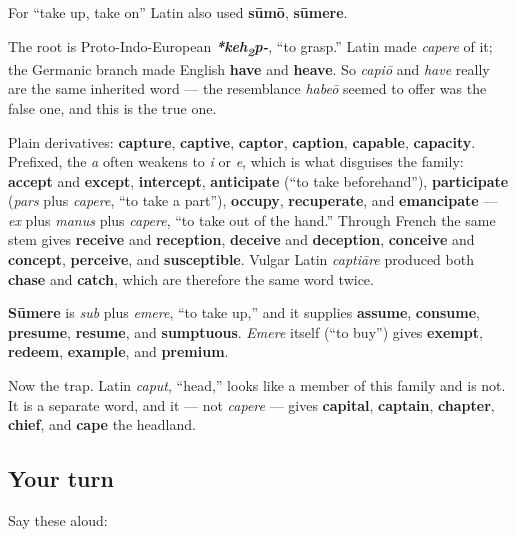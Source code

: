 For \textquotedblleft{}take up, take on\textquotedblright{} Latin also used \textbf{sūmō}, \textbf{sūmere}.

\begin{cousinweb}
The root is Proto-Indo-European \emph{\textbf{*keh\textsubscript{2}p-}}, \textquotedblleft{}to grasp.\textquotedblright{} Latin made \emph{capere} of it; the Germanic branch made English \textbf{have} and \textbf{heave}. So \emph{capiō} and \emph{have} really are the same inherited word — the resemblance \emph{habeō} seemed to offer was the false one, and this is the true one.

Plain derivatives: \textbf{capture}, \textbf{captive}, \textbf{captor}, \textbf{caption}, \textbf{capable}, \textbf{capacity}. Prefixed, the \emph{a} often weakens to \emph{i} or \emph{e}, which is what disguises the family: \textbf{accept} and \textbf{except}, \textbf{intercept}, \textbf{anticipate} (\textquotedblleft{}to take beforehand\textquotedblright{}), \textbf{participate} (\emph{pars} plus \emph{capere}, \textquotedblleft{}to take a part\textquotedblright{}), \textbf{occupy}, \textbf{recuperate}, and \textbf{emancipate} — \emph{ex} plus \emph{manus} plus \emph{capere}, \textquotedblleft{}to take out of the hand.\textquotedblright{} Through French the same stem gives \textbf{receive} and \textbf{reception}, \textbf{deceive} and \textbf{deception}, \textbf{conceive} and \textbf{concept}, \textbf{perceive}, and \textbf{susceptible}. Vulgar Latin \emph{captiāre} produced both \textbf{chase} and \textbf{catch}, which are therefore the same word twice.

\textbf{Sūmere} is \emph{sub} plus \emph{emere}, \textquotedblleft{}to take up,\textquotedblright{} and it supplies \textbf{assume}, \textbf{consume}, \textbf{presume}, \textbf{resume}, and \textbf{sumptuous}. \emph{Emere} itself (\textquotedblleft{}to buy\textquotedblright{}) gives \textbf{exempt}, \textbf{redeem}, \textbf{example}, and \textbf{premium}.

Now the trap. Latin \emph{caput}, \textquotedblleft{}head,\textquotedblright{} looks like a member of this family and is not. It is a separate word, and it — not \emph{capere} — gives \textbf{capital}, \textbf{captain}, \textbf{chapter}, \textbf{chief}, and \textbf{cape} the headland.
\end{cousinweb}

\subsection*{Your turn}
Say these aloud:

